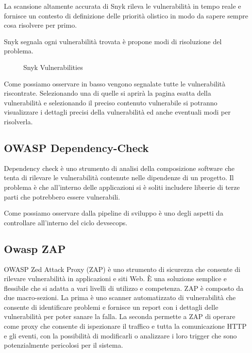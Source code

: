 La scansione altamente accurata di Snyk rileva le vulnerabilità in tempo reale e fornisce un contesto di definizione delle priorità olistico in modo da sapere sempre cosa risolvere per primo.

Snyk segnala ogni vulnerabilità trovata è propone modi di risoluzione del problema.
\begin{figure}[H]
    \caption{Snyk Vulnerabilities}
    \label{fig:snyk}
\end{figure}
Come possiamo osservare in basso vengono segnalate tutte le vulnerabilità riscontrate. Selezionando una di quelle si aprirà la pagina esatta della vulnerabilità e selezionando il preciso contenuto vulnerabile si potranno visualizzare i dettagli precisi della vulnerabilità ed anche eventuali modi per risolverla.
\cite{Snyk}
\subsection{OWASP Dependency-Check} 
Dependency check è uno strumento di analisi della composizione software che tenta di rilevare le vulnerabilità contenute nelle  dipendenze di un progetto. Il problema è che all’interno delle applicazioni si è soliti includere librerie di terze parti che potrebbero essere vulnerabili.

Come possiamo osservare dalla pipeline di sviluppo è uno degli aspetti da controllare all’interno del ciclo devsecops.
\cite{Dependency-Check}
\subsection{Owasp ZAP} 
OWASP Zed Attack Proxy (ZAP) è uno strumento di sicurezza che consente di rilevare vulnerabilità in applicazioni e siti Web. È una soluzione semplice e flessibile che si adatta a vari livelli di utilizzo e competenza. ZAP è composto da due macro-sezioni. La prima è uno scanner automatizzato di vulnerabilità che consente di identificare problemi e fornisce un report con i dettagli delle vulnerabilità per poter sanare la falla. La seconda permette a ZAP di operare come proxy che consente di ispezionare il traffico e tutta la comunicazione HTTP e gli eventi, con la possibilità di modificarli o analizzare i loro trigger che sono potenzialmente pericolosi per il sistema.

